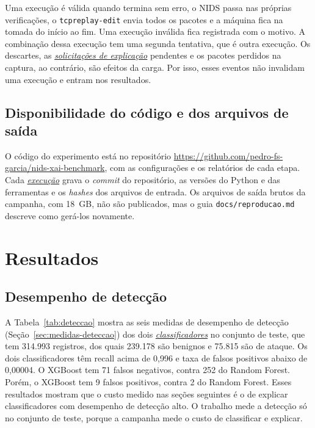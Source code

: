 \documentclass[
  12pt,
  oneside,
  a4paper,
  chapter=TITLE,
  sumario=tradicional,
  english,
  brazil
]{abntex2}
\newcommand{\termo}[2]{\hyperref[gl:#1]{\emph{#2}}}
\begin{document}
Uma execução é válida quando termina sem erro, o NIDS passa nas próprias verificações, o
\texttt{tcpreplay-edit} envia todos os pacotes e a máquina fica na tomada do início ao fim. Uma
execução inválida fica registrada com o motivo. A combinação dessa execução tem uma segunda
tentativa, que é outra execução. Os descartes, as \termo{solicitacao}{solicitações de explicação}
pendentes e os pacotes perdidos na captura, ao contrário, são efeitos da carga. Por isso, esses
eventos não invalidam uma execução e entram nos resultados.

\section{Disponibilidade do código e dos arquivos de saída}
\label{sec:disponibilidade}

O código do experimento está no repositório
\url{https://github.com/pedro-fs-garcia/nids-xai-benchmark}, com as configurações e os relatórios de cada etapa. Cada \termo{execucao}{execução} grava o \emph{commit} do
repositório, as versões do Python e das ferramentas e os \emph{hashes} dos arquivos de entrada. Os arquivos de saída brutos da campanha,
com 18~GB, não são publicados, mas o guia \texttt{docs/reproducao.md} descreve como gerá-los
novamente.

\chapter{Resultados}
\label{cap:resultados}

\section{Desempenho de detecção}
\label{sec:res-deteccao}

A Tabela~\ref{tab:deteccao} mostra as seis medidas de desempenho de detecção
(Seção~\ref{sec:medidas-deteccao}) dos dois \termo{classificador}{classificadores} no conjunto de
teste, que tem 314.993 registros, dos quais 239.178 são benignos e 75.815 são de ataque. Os dois
classificadores têm recall acima de 0,996 e taxa de falsos positivos abaixo de 0,00004. O XGBoost tem
71 falsos negativos, contra 252 do Random Forest. Porém, o XGBoost tem 9 falsos positivos, contra 2
do Random Forest. Esses resultados mostram que o custo medido nas seções seguintes é o de explicar
classificadores com desempenho de detecção alto. O trabalho mede a detecção só no conjunto de
teste, porque a campanha mede o custo de classificar e explicar.
\end{document}
